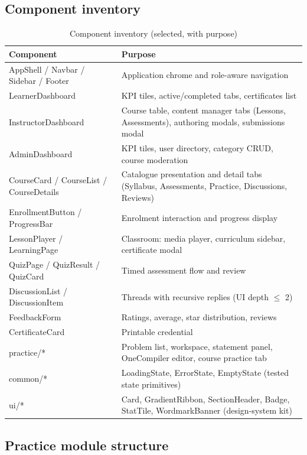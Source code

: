 \subsection{Component inventory}

\begin{table}[H]
\centering
\caption{Component inventory (selected, with purpose)}
\label{tab:component-inventory}
\begin{tabular}{@{}L{3.6cm}L{9.6cm}@{}}
\toprule
\textbf{Component} & \textbf{Purpose} \\
\midrule
AppShell / Navbar / Sidebar / Footer & Application chrome and role-aware navigation \\
LearnerDashboard & KPI tiles, active/completed tabs, certificates list \\
InstructorDashboard & Course table, content manager tabs (Lessons, Assessments), authoring modals, submissions modal \\
AdminDashboard & KPI tiles, user directory, category CRUD, course moderation \\
CourseCard / CourseList / CourseDetails & Catalogue presentation and detail tabs (Syllabus, Assessments, Practice, Discussions, Reviews) \\
EnrollmentButton / ProgressBar & Enrolment interaction and progress display \\
LessonPlayer / LearningPage & Classroom: media player, curriculum sidebar, certificate modal \\
QuizPage / QuizResult / QuizCard & Timed assessment flow and review \\
DiscussionList / DiscussionItem & Threads with recursive replies (UI depth $\leq$ 2) \\
FeedbackForm & Ratings, average, star distribution, reviews \\
CertificateCard & Printable credential \\
practice/* & Problem list, workspace, statement panel, OneCompiler editor, course practice tab \\
common/* & LoadingState, ErrorState, EmptyState (tested state primitives) \\
ui/* & Card, GradientRibbon, SectionHeader, Badge, StatTile, WordmarkBanner (design-system kit) \\
\bottomrule
\end{tabular}
\end{table}

\subsection{Practice module structure}

